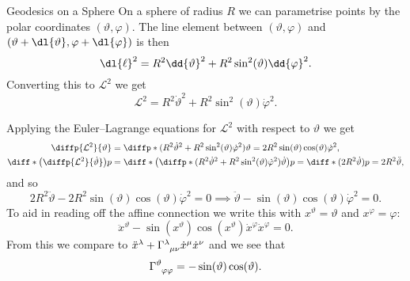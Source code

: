 \documentclass[fleqn]{NotesClass}
\newcommand*{\christoffel}[3]{\tensor{\Gamma}{^{#1}_{{#2}{#3}}}}
\newcommand*{\lagrangian}{\mathcal{L}}
\begin{document}
    \begin{exm}{Geodesics on a Sphere}{}
        On a sphere of radius \(R\) we can parametrise points by the polar coordinates \((\vartheta, \varphi)\).
        The line element between \((\vartheta, \varphi)\) and \((\vartheta + \dl{\vartheta}, \varphi + \dl{\varphi})\) is then
        \begin{equation}
            \dl{\ell}^2 = R^2 \dd{\vartheta}^2 + R^2\sin^2(\vartheta) \dd{\varphi}^2.
        \end{equation}
        Converting this to \(\lagrangian^2\) we get
        \begin{equation}
            \lagrangian^2 = R^2 \dot{\vartheta}^2 + R^2\sin^2(\vartheta) \dot{\varphi}^2.
        \end{equation}
        
        Applying the Euler--Lagrange equations for \(\lagrangian^2\) with respect to \(\vartheta\) we get
        \begin{align}
            \diffp{\lagrangian^2}{\vartheta} &= \diffp*{(R^2\dot{\vartheta}^2 + R^2\sin^2(\vartheta) \dot{\varphi}^2)}{\vartheta} = 2R^2\sin(\vartheta)\cos(\vartheta) \dot{\varphi}^2,\\
            \diff*{\left( \diffp{\lagrangian^2}{\dot{\vartheta}} \right)}{p} &= \diff*{\left( \diffp*{(R^2\dot{\vartheta}^2 + R^2\sin^2(\vartheta) \dot{\varphi}^2)}{\dot{\vartheta}} \right)}{p} = \diff*{(2R^2\dot{\vartheta})}{p} = 2R^2\ddot{\vartheta},\notag
        \end{align}
        and so
        \begin{equation}
            2R^2\ddot{\vartheta} - 2R^2\sin(\vartheta)\cos(\vartheta) \dot{\varphi}^2 = 0 \implies \ddot{\vartheta} - \sin(\vartheta)\cos(\vartheta) \dot{\varphi}^2 = 0.
        \end{equation}
        To aid in reading off the affine connection we write this with \(x^\vartheta = \vartheta\) and \(x^\varphi = \varphi\):
        \begin{equation}
            \ddot{x}^\vartheta - \sin(x^\vartheta)\cos(x^\vartheta) \dot{x}^\varphi \dot{x}^\varphi = 0.
        \end{equation}
        From this we compare to \(\ddot{x}^\lambda + \christoffel{\lambda}{\mu}{\nu} \dot{x}^\mu\dot{x}^\nu\) and we see that
        \begin{equation}
            \christoffel{\vartheta}{\varphi}{\varphi} = -\sin(\vartheta)\cos(\vartheta).
        \end{equation}
        

\end{exm}
\end{document}
